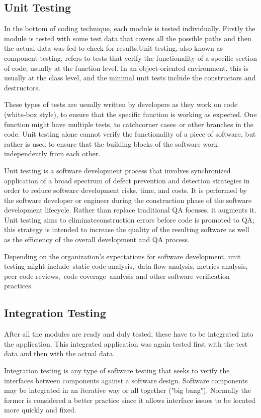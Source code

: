 \subsection{Unit Testing}
In the bottom of coding technique, each module is tested individually. Firstly the module is tested with some test data that covers all the possible paths and then the actual data was fed to check for results.Unit testing, also known as component testing, refers to tests that verify the functionality of a specific section of code, usually at the function level. In an object-oriented environment, this is usually at the class level, and the minimal unit tests include the constructors and destructors.

These types of tests are usually written by developers as they work on code (white-box style), to ensure that the specific function is working as expected. One function might have multiple tests, to catchcorner cases or other branches in the code. Unit testing alone cannot verify the functionality of a piece of software, but rather is used to ensure that the building blocks of the software work independently from each other.

Unit testing is a software development process that involves synchronized application of a broad spectrum of defect prevention and detection strategies in order to reduce software development risks, time, and costs. It is performed by the software developer or engineer during the construction phase of the software development lifecycle. Rather than replace traditional QA focuses, it augments it. Unit testing aims to eliminateconstruction errors before code is promoted to QA; this strategy is intended to increase the quality of the resulting software as well as the efficiency of the overall development and QA process.

Depending on the organization's expectations for software development, unit testing might include static code analysis, data-flow analysis, metrics analysis, peer code reviews, code coverage analysis and other software verification practices.

\subsection{Integration Testing}
After all the modules are ready and duly tested, these have to be integrated into the application. This integrated application was again tested first with the test data and then with the actual data.

Integration testing is any type of software testing that seeks to verify the interfaces between components against a software design. Software components may be integrated in an iterative way or all together ("big bang"). Normally the former is considered a better practice since it allows interface issues to be located more quickly and fixed.

